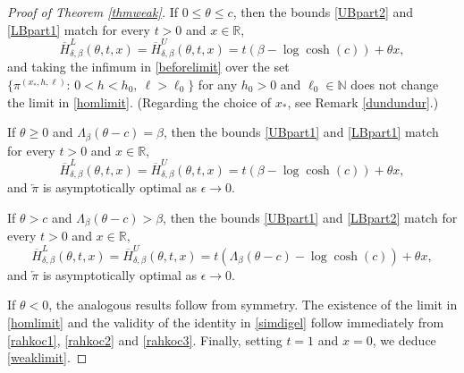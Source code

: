 \documentclass[a4paper]{amsart}
\numberwithin{equation}{section}
\theoremstyle{plain}
\theoremstyle{remark}
\begin{document}
\begin{proof}[Proof of Theorem \ref{thmweak}]
If $0\le\theta\le c$, then the bounds \eqref{UBpart2} and \eqref{LBpart1} match for every $t>0$ and $x\in\mathbb{R}$,
\begin{equation}\label{rahkoc1}
\overline H_{\delta,\beta}^L(\theta,t,x) = \overline H_{\delta,\beta}^U(\theta,t,x) = t(\beta - \log\cosh(c)) + \theta x,
\end{equation}
and taking the infimum in \eqref{beforelimit} over the set $\{{\pi^{(x_*,h,\ell)}}:\,0<h<h_0,\ \ell>\ell_0\}$ for any $h_0>0$ and $\ell_0\in\mathbb{N}$ does not change the limit in \eqref{homlimit}. (Regarding the choice of $x_*$, see Remark \ref{dundundur}.)

If $\theta \ge 0$ and $\Lambda_\beta(\theta-c) = \beta$, then the bounds \eqref{UBpart1} and \eqref{LBpart1} match for every $t>0$ and $x\in\mathbb{R}$,
\begin{equation}\label{rahkoc2} 
\overline H_{\delta,\beta}^L(\theta,t,x) = \overline H_{\delta,\beta}^U(\theta,t,x) = t(\beta - \log\cosh(c)) + \theta x,
\end{equation}
and ${\overleftarrow\pi}$ is asymptotically optimal as ${\epsilon}\to0$.

If $\theta > c$ and $\Lambda_\beta(\theta-c) > \beta$, then the bounds \eqref{UBpart1} and \eqref{LBpart2} match for every $t>0$ and $x\in\mathbb{R}$,
\begin{equation}\label{rahkoc3}
\overline H_{\delta,\beta}^L(\theta,t,x) = \overline H_{\delta,\beta}^U(\theta,t,x) = t(\Lambda_\beta(\theta-c) - \log\cosh(c)) + \theta x,
\end{equation}
and ${\overleftarrow\pi}$ is asymptotically optimal as ${\epsilon}\to0$.

If $\theta<0$, the analogous results follow from symmetry. The existence of the limit in \eqref{homlimit} and the validity of the identity in \eqref{simdigel} follow immediately from \eqref{rahkoc1}, \eqref{rahkoc2} and \eqref{rahkoc3}. Finally, setting $t=1$ and $x=0$, we deduce \eqref{weaklimit}.
\end{proof}
\end{document}
